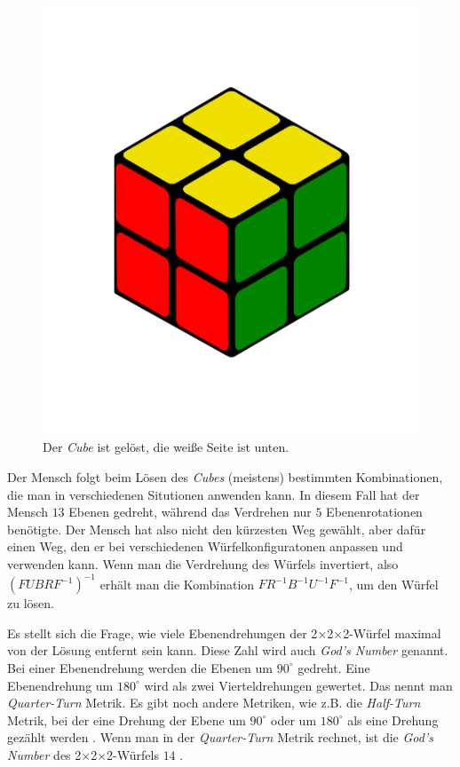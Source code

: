 \documentclass[12pt,a4paper, usenames, dvipsnames]{article}
\theoremstyle{mystyle}
\theoremstyle{definition}
\newcommand{\Ttwo}{2$\times$2$\times$2-}
\begin{document}
\begin{figure}[H]
\centering
\includegraphics[scale=0.12]{menschSchritt5.png}
\caption[Lösung von Mensch: Schritt 5]{Der \textit{Cube} ist gelöst, die weiße Seite ist unten.}
\label{23}
\end{figure}

Der Mensch folgt beim Lösen des \textit{Cubes} (meistens) bestimmten Kombinationen, die man in verschiedenen Situtionen anwenden kann.  
In diesem Fall hat der Mensch $13$ Ebenen gedreht, während das Verdrehen nur $5$ Ebenenrotationen benötigte. Der Mensch hat also nicht den kürzesten Weg gewählt, aber dafür einen Weg, den er bei verschiedenen Würfelkonfiguratonen anpassen und verwenden kann. 
Wenn man die Verdrehung des Würfels invertiert, also $(FUBRF^{-1})^{-1}$ erhält man die Kombination $FR^{-1}B^{-1}U^{-1}F^{-1}$, um den Würfel zu lösen.


Es stellt sich die Frage, wie viele Ebenendrehungen der \Ttwo Würfel maximal von der Lösung entfernt sein kann. Diese Zahl wird auch \textit{God's Number} genannt. \\ 
Bei einer Ebenendrehung werden die Ebenen um $90^\circ$ gedreht. Eine Ebenendrehung um $180^\circ$ wird als zwei Vierteldrehungen gewertet. Das nennt man \textit{Quarter-Turn} Metrik. Es gibt noch andere Metriken, wie z.B. die \textit{Half-Turn} Metrik, bei der eine Drehung der Ebene um $90^\circ$ oder um $180^\circ$ als eine Drehung gezählt werden \cite{TR}.
Wenn man in der \textit{Quarter-Turn} Metrik rechnet, ist die \textit{God's Number} des \Ttwo Würfels $14$ \cite{DJ}.
\end{document}
